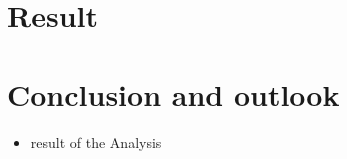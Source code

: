 \chapter{Result}

\chapter{Conclusion and outlook} \label{conclusion}

\begin{itemize}
\item result of the Analysis
\end{itemize}